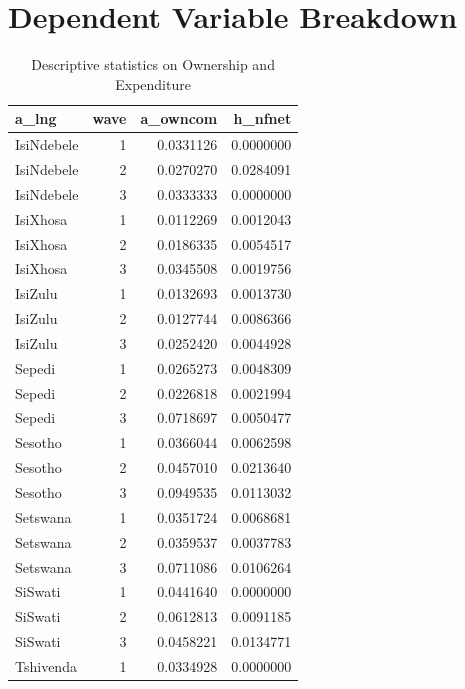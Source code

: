 \documentclass[a4paper,british]{article}\usepackage[]{graphicx}\usepackage[]{color}
\newenvironment{knitrout}{}{} %
\begin{document}
\section{Dependent Variable Breakdown}

\begin{table}[H]
\caption{Descriptive statistics on Ownership and Expenditure}
\label{tab:dep_vars}
\centering{}
\begin{knitrout}
\color{fgcolor}


\begin{tabular}{l|r|r|r}
\hline
a\_lng & wave & a\_owncom & h\_nfnet\\
\hline
IsiNdebele & 1 & 0.0331126 & 0.0000000\\
\hline
IsiNdebele & 2 & 0.0270270 & 0.0284091\\
\hline
IsiNdebele & 3 & 0.0333333 & 0.0000000\\
\hline
IsiXhosa & 1 & 0.0112269 & 0.0012043\\
\hline
IsiXhosa & 2 & 0.0186335 & 0.0054517\\
\hline
IsiXhosa & 3 & 0.0345508 & 0.0019756\\
\hline
IsiZulu & 1 & 0.0132693 & 0.0013730\\
\hline
IsiZulu & 2 & 0.0127744 & 0.0086366\\
\hline
IsiZulu & 3 & 0.0252420 & 0.0044928\\
\hline
Sepedi & 1 & 0.0265273 & 0.0048309\\
\hline
Sepedi & 2 & 0.0226818 & 0.0021994\\
\hline
Sepedi & 3 & 0.0718697 & 0.0050477\\
\hline
Sesotho & 1 & 0.0366044 & 0.0062598\\
\hline
Sesotho & 2 & 0.0457010 & 0.0213640\\
\hline
Sesotho & 3 & 0.0949535 & 0.0113032\\
\hline
Setswana & 1 & 0.0351724 & 0.0068681\\
\hline
Setswana & 2 & 0.0359537 & 0.0037783\\
\hline
Setswana & 3 & 0.0711086 & 0.0106264\\
\hline
SiSwati & 1 & 0.0441640 & 0.0000000\\
\hline
SiSwati & 2 & 0.0612813 & 0.0091185\\
\hline
SiSwati & 3 & 0.0458221 & 0.0134771\\
\hline
Tshivenda & 1 & 0.0334928 & 0.0000000\\
\hline

\end{tabular}
\end{knitrout}
\end{table}
\end{document}
